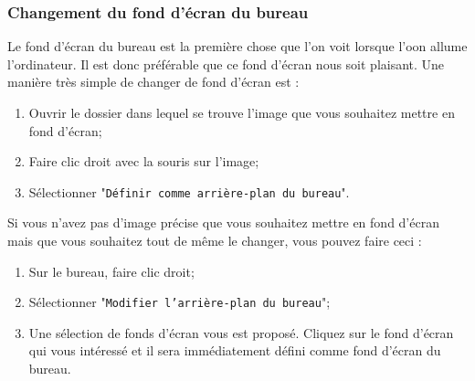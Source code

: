 \documentclass[12pt]{book}
\begin{document}
		\subsubsection{Changement du fond d'écran du bureau}
			Le fond d'écran du bureau est la première chose que l'on voit lorsque l'oon allume l'ordinateur.
			Il est donc préférable que ce fond d'écran nous soit plaisant.\newline
			Une manière très simple de changer de fond d'écran est :
			\begin{enumerate}
				\item Ouvrir le dossier dans lequel se trouve l'image que vous souhaitez mettre en fond d'écran;
				\item Faire clic droit avec la souris sur l'image;
				\item Sélectionner "\texttt{Définir comme arrière-plan du bureau}".
			\end{enumerate}
			Si vous n'avez pas d'image précise que vous souhaitez mettre en fond d'écran mais que vous souhaitez tout de même le changer, vous pouvez faire ceci :
			\begin{enumerate}
				\item Sur le bureau, faire clic droit;
				\item Sélectionner "\texttt{Modifier l'arrière-plan du bureau}";
				\item Une sélection de fonds d'écran vous est proposé. Cliquez sur le fond d'écran qui vous intéressé et il sera immédiatement défini comme fond d'écran du bureau.
			\end{enumerate}
\end{document}
